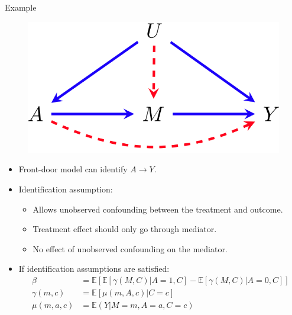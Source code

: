 \documentclass{beamer}
\begin{document}
\begin{frame}{Example}
	\begin{figure}
		\center
		\includegraphics[scale=0.2]{m2.png}
	\end{figure}
	\begin{itemize}
		\item Front-door model can identify $ A \rightarrow Y $.
		\item Identification assumption:
			\begin{itemize}
				\item Allows unobserved confounding between the treatment and outcome.
				\item Treatment effect should only go through mediator.
				\item No effect of unobserved confounding on the mediator.
			\end{itemize}
		\item If identification assumptions are satisfied:
			\begin{equation*}
				\begin{split}
					\beta &= \mathbb{E}[\mathbb{E}[\gamma(M, C) | A = 1, C] - \mathbb{E}[\gamma(M, C) | A =0, C]] \\
					\gamma(m, c) &= \mathbb{E}[\mu(m, A, c) | C=c] \\
					\mu(m, a, c) &= \mathbb{E}(Y | M=m, A=a, C=c)
				\end{split}
			\end{equation*}
	\end{itemize}
\end{frame}
\end{document}
